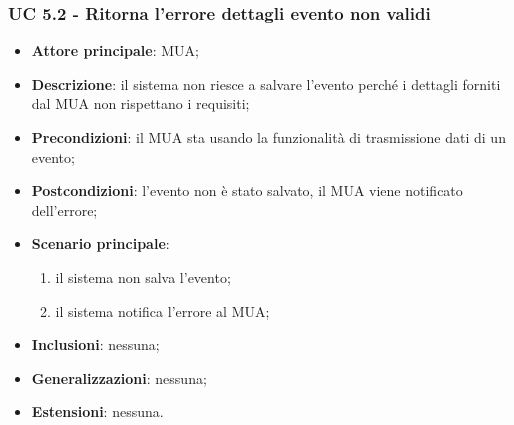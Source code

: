 \subsubsection{UC 5.2 - Ritorna l'errore dettagli evento non validi} \label{sec:UC5.2}
    \begin{itemize}
        \item \textbf{Attore principale}: MUA;
        \item \textbf{Descrizione}: il sistema non riesce a salvare l'evento perché i dettagli forniti dal MUA non rispettano i requisiti;
        \item \textbf{Precondizioni}: il MUA sta usando la funzionalità di trasmissione dati di un evento;
        \item \textbf{Postcondizioni}: l'evento non è stato salvato, il MUA viene notificato dell'errore;
        \item \textbf{Scenario principale}:
            \begin{enumerate}
                \item il sistema non salva l'evento;
                \item il sistema notifica l'errore al MUA;
            \end{enumerate}
        \item \textbf{Inclusioni}: nessuna;
        \item \textbf{Generalizzazioni}: nessuna;
        \item \textbf{Estensioni}: nessuna.
    \end{itemize}